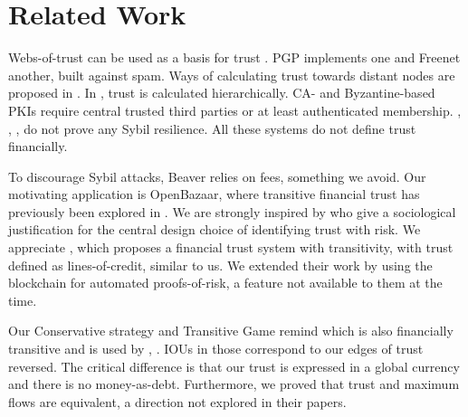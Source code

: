 \section{Related Work}
  Webs-of-trust can be used as a basis for trust \cite{wot}. PGP \cite{pgp} implements one and Freenet \cite{freenet}
  another, built against spam. Ways of calculating trust towards distant nodes are proposed in \cite{mui,beta}. In \cite{vpc},
  trust is calculated hierarchically. CA- and Byzantine-based \cite{byzantine} PKIs \cite{pki} require central trusted third
  parties or at least authenticated membership. \cite{fire}, \cite{core}, \cite{ghkkw}, \cite{rk} do not prove any Sybil
  resilience. All these systems do not define trust financially.

  To discourage Sybil attacks, Beaver \cite{beaver} relies on fees, something we avoid.  Our motivating application is
  OpenBazaar, where transitive financial trust has previously been explored in \cite{dionyziz}. We are strongly inspired by
  \cite{kmrs} who give a sociological justification for the central design choice of identifying trust with risk. We
  appreciate \cite{davis}, which proposes a financial trust system with transitivity, with trust defined as lines-of-credit,
  similar to us. We extended their work by using the blockchain for automated proofs-of-risk, a feature not available to them
  at the time.

  Our Conservative strategy and Transitive Game remind \cite{iou} which is also financially transitive and is used by
  \cite{ripple}, \cite{stellar}. IOUs in those correspond to our edges of trust reversed. The critical difference
  is that our trust is expressed in a global currency and there is no money-as-debt. Furthermore, we proved that trust and
  maximum flows are equivalent, a direction not explored in their papers.
